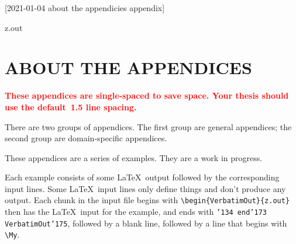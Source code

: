 [2021-01-04 about the appendicies appendix]

\begin{VerbatimOut}{z.out}
\chapter{ABOUT THE APPENDICES}


\textcolor{red}{%
  \textbf{%
    These appendices are single-spaced to save space.
    Your thesis should use the default~1.5 line spacing.%
  }%
}

There are two groups of appendices.
The first group are general appendices;
the second group are domain-specific appendices.

These appendices are a series of examples.
They are a work in progress.

Each example consists of some \LaTeX\ output
followed by the corresponding input lines.
Some \LaTeX\ input lines only define things
and don't produce any output.
Each chunk in the input file begins with
\verb+\begin{VerbatimOut}{z.out}+
then has the \LaTeX\ input for the example,
and ends with {\tt \char'134 end\char'173 VerbatimOut\char'175},
followed by a blank line,
followed by a line that begins with
\verb+\My+.

\end{VerbatimOut}

\MyIO


